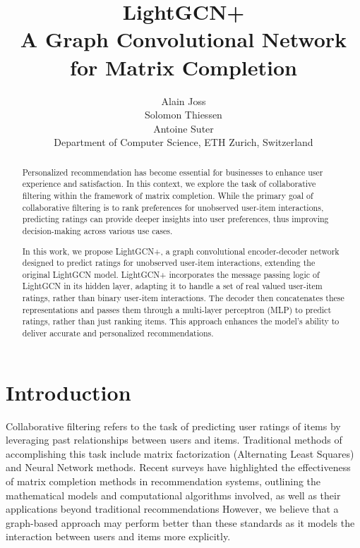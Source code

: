 \documentclass[10pt,conference,compsocconf]{IEEEtran}
\begin{document}
\title{LightGCN+ \\ A Graph Convolutional Network for Matrix Completion}

\author{
  Alain Joss \\
  Solomon Thiessen \\
  Antoine Suter \\
  Department of Computer Science, ETH Zurich, Switzerland
}

\maketitle

\begin{abstract}
  Personalized recommendation has become essential for businesses to enhance user experience and satisfaction. 
  In this context, we explore the task of collaborative filtering within the framework of matrix completion. 
  While the primary goal of collaborative filtering is to rank preferences for unobserved user-item interactions, 
  predicting ratings can provide deeper insights into user preferences, 
  thus improving decision-making across various use cases.
  
  In this work, we propose LightGCN+, a graph convolutional encoder-decoder network designed to predict ratings for unobserved user-item interactions, 
  extending the original LightGCN model. 
  LightGCN+ incorporates the message passing logic of LightGCN in its hidden layer, adapting it to handle a set of real valued user-item ratings, rather than binary user-item interactions.
  The decoder then concatenates these representations and passes them through a multi-layer perceptron (MLP) to predict ratings, rather than just ranking items. 
  This approach enhances the model's ability to deliver accurate and personalized recommendations.
\end{abstract}


\section{Introduction}

Collaborative filtering refers to the task of predicting user ratings of items by leveraging past relationships between users and items. Traditional methods of accomplishing this task include matrix factorization (Alternating Least Squares) and Neural Network methods. 
Recent surveys \cite{} have highlighted the effectiveness of matrix completion methods in recommendation systems, outlining the mathematical models and computational algorithms involved, as well as their applications beyond traditional recommendations
However, we believe that a graph-based approach may perform better than these standards as it models the interaction between users and items more explicitly.
\end{document}
